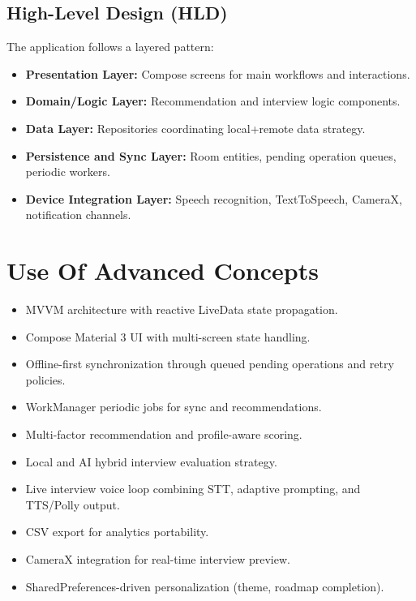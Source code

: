 \documentclass[conference]{IEEEtran}
\begin{document}
\subsection{High-Level Design (HLD)}

The application follows a layered pattern:

\begin{itemize}
  \item \textbf{Presentation Layer:} Compose screens for main workflows and interactions.
  \item \textbf{Domain/Logic Layer:} Recommendation and interview logic components.
  \item \textbf{Data Layer:} Repositories coordinating local+remote data strategy.
  \item \textbf{Persistence and Sync Layer:} Room entities, pending operation queues, periodic workers.
  \item \textbf{Device Integration Layer:} Speech recognition, TextToSpeech, CameraX, notification channels.
\end{itemize}

\section{Use Of Advanced Concepts}

\begin{itemize}
  \item MVVM architecture with reactive LiveData state propagation.
  \item Compose Material 3 UI with multi-screen state handling.
  \item Offline-first synchronization through queued pending operations and retry policies.
  \item WorkManager periodic jobs for sync and recommendations.
  \item Multi-factor recommendation and profile-aware scoring.
  \item Local and AI hybrid interview evaluation strategy.
  \item Live interview voice loop combining STT, adaptive prompting, and TTS/Polly output.
  \item CSV export for analytics portability.
  \item CameraX integration for real-time interview preview.
  \item SharedPreferences-driven personalization (theme, roadmap completion).
\end{itemize}
\end{document}

